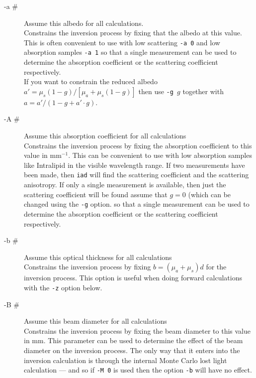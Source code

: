 \documentclass{article}
\begin{document}
\begin{description}
    \item[-a \#] Assume this albedo for all calculations.\\[1mm]
                 Constrains the inversion process by fixing that the albedo at this value.  This 
                 is often convenient to use with low scattering \texttt{-a 0} and low absorption samples \texttt{-a 1}
                 so that a single measurement can be used to determine the absorption coefficient or the scattering
                 coefficient respectively.\\[1mm]
                 If you want to constrain the reduced albedo $a'=\mu_s(1-g)/[\mu_a + \mu_s(1-g)]$ then use \texttt{-g }$g$
                 together with $a = a' / (1 - g + a'\cdot g)$.
                 
    \item[-A \#] Assume this absorption coefficient for all calculations\\[1mm]
                 Constrains the inversion process by fixing the absorption coefficient to this value in mm$^{-1}$.  
                 This can be convenient to use with low absorption samples like Intralipid in the visible wavelength
                 range. If two measurements have been made, then \texttt{iad} will find the scattering coefficient and
                 the scattering anisotropy.  If only a single measurement is available, then just the scattering coefficient
                 will be found assume that $g=0$ (which can be changed using the \texttt{-g} option.
                 so that a single measurement can be used to determine the absorption coefficient or the scattering
                 coefficient respectively.
                 
    \item[-b \#] Assume this optical thickness for all calculations\\[1mm]
                 Constrains the inversion process by fixing $b=(\mu_a+\mu_s)d$ for the inversion process. This option
                 is useful when doing forward calculations with the \texttt{-z} option below.
                     
    \item[-B \#] Assume this beam diameter for all calculations\\[1mm]
                 Constrains the inversion process by fixing the beam diameter to this value in mm.  This parameter
                 can be used to determine the effect of the beam diameter on the inversion process.  The only way
                 that it enters into the inversion calculation is through the internal Monte Carlo lost light
                 calculation --- and so if \texttt{-M 0} is used then the option \texttt{-b} will have
                 no effect.
                 

\end{description}
\end{document}

